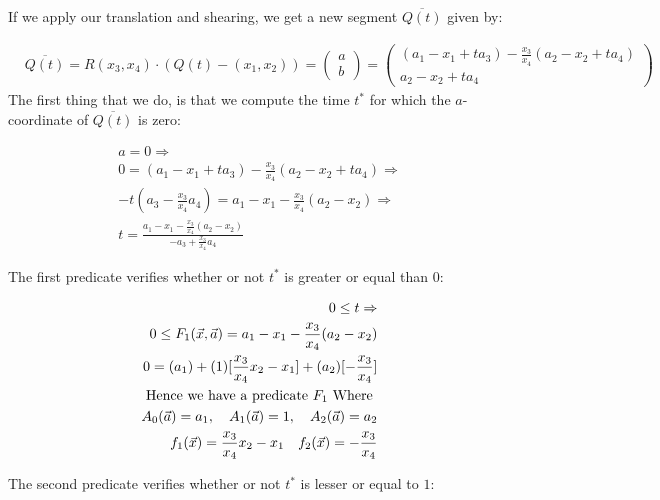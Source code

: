 \documentclass{article}
\begin{document}
If we apply our translation and shearing, we get a new segment $\overline{Q(t)}$ given by:

\begin{align*}
    &\overline{Q(t)} = R(x_3, x_4) \cdot (Q(t) - (x_1, x_2)) =  
    \left( \begin{array}{c}
         a  \\
         b 
    \end{array} \right) =
    \left( \begin{array}{c}
         (a_1 - x_1 + t a_3) - \frac{x_3}{x_4}(a_2 - x_2 + t a_4 )  \\
         a_2 - x_2 + t a_4 
    \end{array} \right)
\end{align*}
The first thing that we do, is that we compute the time $t^*$ for which the $a$-coordinate of $\overline{Q(t)}$ is zero:

\begin{align*}
    a = 0 \Rightarrow \\
    0 = (a_1 - x_1 + t a_3) - \frac{x_3}{x_4}(a_2 - x_2 + t a_4 )   \Rightarrow \\
    - t ( a_3 -  \frac{x_3}{x_4} a_4) = a_1 - x_1 - \frac{x_3}{x_4} (a_2 - x_2) \Rightarrow \\
    t = \frac{   a_1 - x_1 - \frac{x_3}{x_4} (a_2 - x_2)}{ - a_3 + \frac{x_3}{x_4}a_4}
\end{align*}

The first predicate verifies whether or not $t^*$ is greater or equal than $0$:

\begin{align*}
    0 \le t \Rightarrow \\
   0 \le F_1(\vec{x}, \vec{a}) = a_1 - x_1 - \frac{x_3}{x_4} (a_2 - x_2)  \\
    0 = (a_1) + (1)[\frac{x_3}{x_4}x_2 - x_1] + (a_2) [ - \frac{x_3}{x_4} ] \\
    \textnormal{Hence we have a predicate } F_1 \textnormal{ Where }\\
    A_0(\vec{a}) = a_1, \quad A_1(\vec{a}) = 1,\quad A_2(\vec{a}) = a_2 \\
    f_1(\vec{x}) = \frac{x_3}{x_4}x_2 - x_1 \quad f_2(\vec{x}) = - \frac{x_3}{x_4}
\end{align*}

The second predicate verifies whether or not $t^*$ is lesser or equal to $1$:
\end{document}
